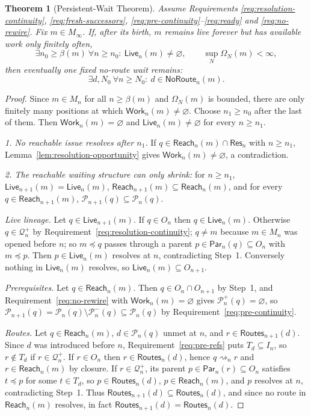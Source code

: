 \documentclass[11pt]{article}
\newtheorem{theorem}{Theorem}
\theoremstyle{definition}
\theoremstyle{remark}
\newcommand{\Pre}{\mathcal P}
\newcommand{\Live}{\mathsf{Live}}
\newcommand{\Routes}{\mathsf{Routes}}
\newcommand{\Reach}{\mathsf{Reach}}
\newcommand{\Work}{\mathsf{Work}}
\newcommand{\NoRoute}{\mathsf{NoRoute}}
\newcommand{\ResSet}{\mathsf{Res}}
\newcommand{\Par}{\mathsf{Par}}
\newcommand{\Born}{\mathcal Q^{+}}
\begin{document}
\begin{theorem}[Persistent-Wait Theorem]\label{thm:persistent-wait}
Assume Requirements \ref{req:resolution-continuity}, \ref{req:fresh-successors},
\ref{req:pre-continuity}--\ref{req:ready} and \ref{req:no-rewire}.
Fix $m\in M_\infty$. If, after its birth,
$m$ remains live forever but has available work only finitely often,
\[
 \exists n_0\ge\beta(m)\ \forall n\ge n_0:\ \Live_n(m)\neq\varnothing,
 \qquad
 \sup_N\Omega_N(m)<\infty,
\]
then eventually one fixed no-route wait remains:
\[
 \exists d,N_0\ \forall n\ge N_0:\ d\in\NoRoute_n(m).
\]
\end{theorem}

\begin{proof}
Since $m\in M_n$ for all $n\ge\beta(m)$ and $\Omega_N(m)$ is bounded, there are
only finitely many positions at which $\Work_n(m)\neq\varnothing$. Choose
$n_1\ge n_0$ after the last of them. Then $\Work_n(m)=\varnothing$ and
$\Live_n(m)\neq\varnothing$ for every $n\ge n_1$.

\emph{1. No reachable issue resolves after $n_1$.}
If $q\in\Reach_n(m)\cap\ResSet_n$ with $n\ge n_1$, Lemma~\ref{lem:resolution-opportunity}
gives $\Work_n(m)\neq\varnothing$, a contradiction.

\emph{2. The reachable waiting structure can only shrink:}
for $n\ge n_1$, $\Live_{n+1}(m)=\Live_n(m)$,
$\Reach_{n+1}(m)\subseteq\Reach_n(m)$, and for every
$q\in\Reach_{n+1}(m)$, $\Pre_{n+1}(q)\subseteq\Pre_n(q)$.

\emph{Live lineage.} Let $q\in\Live_{n+1}(m)$. If $q\in O_n$ then
$q\in\Live_n(m)$. Otherwise $q\in\Born_n$ by
Requirement~\ref{req:resolution-continuity}; $q\neq m$ because $m\in M_n$ was
opened before $n$; so $m\preceq q$ passes through a parent
$p\in\Par_n(q)\subseteq O_n$ with $m\preceq p$. Then $p\in\Live_n(m)$ resolves
at $n$, contradicting Step~1. Conversely nothing in $\Live_n(m)$ resolves, so
$\Live_n(m)\subseteq O_{n+1}$.

\emph{Prerequisites.} Let $q\in\Reach_n(m)$. Then $q\in O_n\cap O_{n+1}$ by
Step~1, and Requirement~\ref{req:no-rewire} with $\Work_n(m)=\varnothing$
gives $\Pre_n^+(q)=\varnothing$, so
$\Pre_{n+1}(q)=\Pre_n(q)\setminus\Pre_n^-(q)\subseteq\Pre_n(q)$ by
Requirement~\ref{req:pre-continuity}.

\emph{Routes.} Let $q\in\Reach_n(m)$, $d\in\Pre_n(q)$ unmet at $n$, and
$r\in\Routes_{n+1}(d)$. Since $d$ was introduced before $n$,
Requirement~\ref{req:pre-refs} puts $T_d\subseteq I_n$, so $r\notin T_d$ if
$r\in\Born_n$. If $r\in O_n$ then $r\in\Routes_n(d)$, hence $q\rightsquigarrow_n r$
and $r\in\Reach_n(m)$ by closure. If $r\in\Born_n$, its parent
$p\in\Par_n(r)\subseteq O_n$ satisfies $t\preceq p$ for some $t\in T_d$, so
$p\in\Routes_n(d)$, $p\in\Reach_n(m)$, and $p$ resolves at $n$, contradicting
Step~1. Thus $\Routes_{n+1}(d)\subseteq\Routes_n(d)$, and since no route in
$\Reach_n(m)$ resolves, in fact $\Routes_{n+1}(d)=\Routes_n(d)$.


\end{proof}
\end{document}
